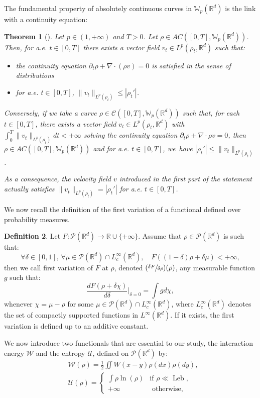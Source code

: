 \documentclass[JEP,XML,SOM,Unicode, NoFloatCountersInSection,published]{cedram}
\newcommand{\Psfrac}[2]{(\sfrac{#1}{#2})}
\DeclareMathOperator{\Leb}{Leb}
\def\RR{\mathbb{R}}
\def\WW{\mathbb{W}}
\def\pa{\partial}
\def\calC{{\mathcal C}}
\def\calP{{\mathcal P}}
\def\calU{{\mathcal U}}
\def\calW{{\mathcal W}}
\theoremstyle{plain}
\newtheorem{theorem}{Theorem}[section]
\theoremstyle{definition}
\newtheorem{defi}[theorem]{Definition}
\begin{document}
The fundamental property of absolutely continuous curves in $\WW_p(\RR^d)$ is the link with a continuity equation:
\begin{theorem}[{\cite[Th.\,8.3.1]{ambrosio08}}]\label{thm:ACcurves}
Let $p \!\in\! (1,+\infty)$ and $T\!>\!0$.
Let $\rho \!\in\! AC([0,T], \WW_p(\RR^d))$. Then, for a.e. $t \in [0,T]$ there exists a vector field $v_t \in L^p(\rho_t, \RR^d)$ such that:
\begin{itemize}
\item the continuity equation $\pa_t \rho + \nabla \cdot (\rho v) = 0$ is satisfied in the sense of distributions
\item for a.e. $t \in [0,T]$, $\|v_t\|_{L^p(\rho_t)} \leq |\rho_t'|$.
\end{itemize}
Conversely, if we take a curve $\rho \in \calC([0,T], \WW_p(\RR^d))$ such that, for each $t \in [0,T]$, there exists a vector field $v_t \in L^p(\rho_t, \RR^d)$ with $\int_0^T \|v_t\|_{L^p(\rho_t)} dt < +\infty $ solving the continuity equation $\pa_t \rho + \nabla \cdot \rho v = 0$, then $\rho \in AC([0,T], \WW_p(\RR^d))$ and for a.e. $t \in [0,T]$, we~have $|\rho_t'| \leq \|v_t\|_{L^p(\rho_t)}$.

As a consequence, the velocity field $v$ introduced in the first part of the statement actually satisfies $\|v_t\|_{L^p(\rho_t)} = |\rho_t'|$ for a.e. $t \in [0,T]$.
\end{theorem}
We now recall the definition of the first variation of a functional defined over probability measures.
\begin{defi}
Let $F : \calP(\RR^d) \longrightarrow \RR \cup \{+\infty\}$. Assume that $\rho \in \calP(\RR^d)$ is such that:
\[
\forall \delta \in [0,1], \, \forall \mu \in \calP(\RR^d) \cap L_c^\infty(\RR^d), \quad F((1-\delta) \rho + \delta \mu) < +\infty,
\]
then we call first variation of $F$ at $\rho$, denoted $\Psfrac{\delta F}{\delta \rho}(\rho)$, any measurable function $g$ such that:
\[
\frac{d F(\rho + \delta \chi)}{d \delta}\Big|_{\delta = 0} = \int g d\chi,
\]
whenever $\chi = \mu - \rho$ for some $\mu \in \calP(\RR^d) \cap L_c^\infty(\RR^d)$, where $L_c^\infty(\RR^d)$ denotes the set of compactly supported functions in $L^\infty(\RR^d)$. If it exists, the first variation is defined up to an additive constant.
\end{defi}
We now introduce two functionals that are essential to our study, the interaction energy $\calW$ and the entropy $\calU$, defined on $\calP(\RR^d)$ by:
\begin{align*}
& \calW(\rho) = \frac 12 \iint W(x-y) \rho(dx) \rho(dy), \\
& \calU(\rho) = \begin{cases}
\int \rho \ln(\rho) & \text{if } \rho \ll \Leb, \\
+\infty & \text{ otherwise,}
\end{cases}
\end{align*}
\end{document}
